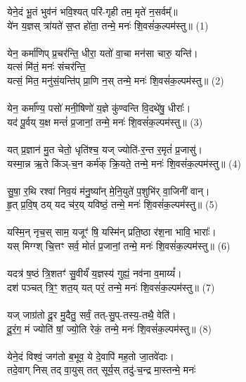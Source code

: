 \subsection{}
\\
येने॒दं भू॒तं भुव॑नं भवि॒श्यत् परि॑-गृही तम॒ मृते॑ न॒सर्वम्᳚॥ \\
ये॑न य॒ज्ञस् त्रा॑यते॑ स॒प्त हो॑ता॒ तन्मे॒ मनः॑ शि॒वसं॑क॒ल्पम॑स्तु॥ (1)\\
\\
येन॒ कर्मा॑णिप् प्र॒चर॑न्ति॒ धीरा॒ यतो॑ वा॒चा मन॑सा चारु॒ यन्ति॑। \\
यत्सं मि॑तं॒ मनः॑ संचर॑न्ति॒\\
{\small यत्सं॒ मित॒ मनु॑सं॒यन्ति॑प् प्रा॒णि न॒स्} तन्मे॒ मनः॑ शि॒वसं॑क॒ल्पम॑स्तु॥ (2)\\
\\
येन॒ कर्मा᳚ण्य॒ पसो॑ मनी॒षिणो॑ य॒ज्ञे कु॑ण्वन्ति वि॒दथे॑षु॒ धीराः᳚। \\
यद॑ पू॒र्वय् य॒क्ष मन्तं॑ प्र॒जानां॒ तन्मे॒ मनः॑ शि॒वसं॑क॒ल्पम॑स्तु॥ (3)\\
\\
यत् प्र॒ज्ञान॑ मु॒त चेतो॒ धृति॑श्च॒ यज् ज्योति॑-र॒न्त र॒मृतं॑ प्र॒जासु॑।\\
यस्मा॒न्न ऋ॒ते कि॑ञ्-च॒न कर्म॑क् क्रि॒यते॒ तन्मे॒ मनः॑ शि॒वसं॑क॒ल्पम॑स्तु॥ (4)\\
\\
सु॒षा॒ र॒थि रश्वा॑ निव॒यं म॑नु॒ष्या᳚न् मे॒नि॒युते॑ प॒शुभि॑र् वा॒जिनी॑ वान्। \\
हृ॒त् प्र॒वि॒ष् ठय् यद च॑र॒य् यविष्ठं॒ तन्मे॒ मनः॑ शि॒वसं॑क॒ल्पम॑स्तु॥ (5)\\
\\
यस्मि॒न् नृच॒स् साम॒ यजूꣳ॑ षि॒ यस्मि॑न् प्रति॒ष्ठा र॑श॒ना भावि॒ भाराः᳚। \\
यस् मिग्ग्श् चि॒त्तꣳ सर्व॒ मोतं॑ प्र॒जानां॒ तन्मे॒ मनः॑ शि॒वसं॑क॒ल्पम॑स्तु॥ (6)\\
 \\
यदत्र॑ ष॒ष्ठं त्रि॒शतꣳ॑ सु॒वीर्यं॑ य॒ज्ञस्य॑ गुह्यं॒ नव॑ना व॒माय्यं᳚। \\
दश॑ पञ्चत् त्रि॒ꣳ॒ शत॒य् यत् परं॒ तन्मे॒ मनः॑ शि॒वसं॑क॒ल्पम॑स्तु॥ (7)\\
\\
यज् जाग्र॑तो दू॒र मु॒दैतु॒ सर्वं॒ तत्-सु॒प्-तस्य॒-तथै॒ वेति॑।\\
दू॒रं॒ग॒ मं ज्योति॑ षां॒ ज्यो॒ति रेकं॒ तन्मे॒ मनः॑ शि॒वसं॑क॒ल्पम॑स्तु॥ (8)\\
\\
येने॒दं विश्वं॒ जग॑तो ब॒भूव॒ ये दे॒वापि॑ मह॒तो जा॒तवे॑दाः।\\
तदे॒वाग् निस् तद् वा॒युस् तत् सूर्य॒स् तदु॑-च॒न्द्र मा॒स्तन्मे॒ मनः॑\\
